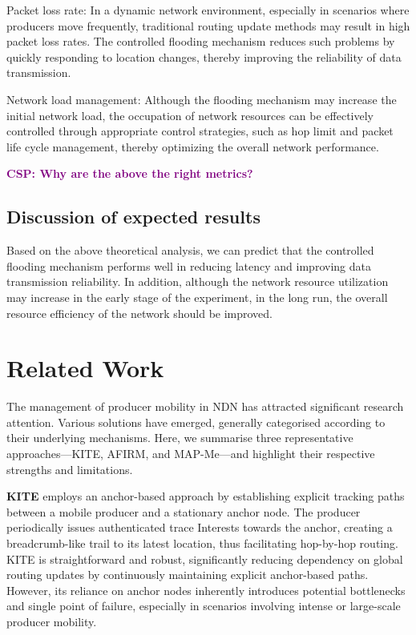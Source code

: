 \documentclass[conference]{IEEEtran}
\newcommand{\csp}[1]{\textbf{\textcolor{purple}{CSP: #1}}}
\begin{document}
Packet loss rate: In a dynamic network environment, especially in scenarios where producers move frequently, traditional routing update methods may result in high packet loss rates. The controlled flooding mechanism reduces such problems by quickly responding to location changes, thereby improving the reliability of data transmission.

Network load management: Although the flooding mechanism may increase the initial network load, the occupation of network resources can be effectively controlled through appropriate control strategies, such as hop limit and packet life cycle management, thereby optimizing the overall network performance.

\csp{Why are the above the right metrics?}

\subsection{Discussion of expected results}
Based on the above theoretical analysis, we can predict that the controlled flooding mechanism performs well in reducing latency and improving data transmission reliability. In addition, although the network resource utilization may increase in the early stage of the experiment, in the long run, the overall resource efficiency of the network should be improved.

\section{Related Work}

The management of producer mobility in NDN has attracted significant research attention. Various solutions have emerged, generally categorised according to their underlying mechanisms. Here, we summarise three representative approaches—KITE, AFIRM, and MAP-Me—and highlight their respective strengths and limitations.

\textbf{KITE} \cite{KITE} employs an anchor-based approach by establishing explicit tracking paths between a mobile producer and a stationary anchor node. The producer periodically issues authenticated trace Interests towards the anchor, creating a breadcrumb-like trail to its latest location, thus facilitating hop-by-hop routing. KITE is straightforward and robust, significantly reducing dependency on global routing updates by continuously maintaining explicit anchor-based paths. However, its reliance on anchor nodes inherently introduces potential bottlenecks and single point of failure, especially in scenarios involving intense or large-scale producer mobility.
\end{document}
